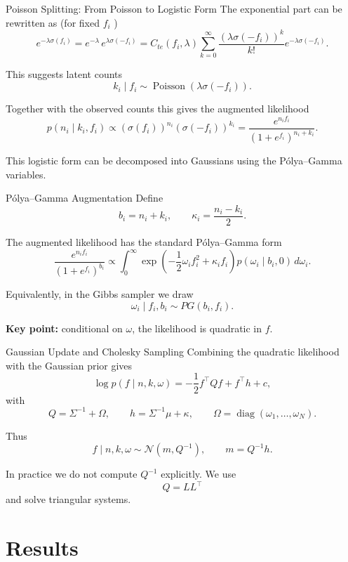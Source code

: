 \documentclass[11pt]{beamer}
\newcommand{\sigmoid}{\sigma}
\begin{document}
\begin{frame}{Poisson Splitting: From Poisson to Logistic Form}
The exponential part can be rewritten as (for fixed $f_i$ )
\[
e^{-\lambda\sigmoid(f_i)}
=
e^{-\lambda}\,e^{\lambda\sigmoid(-f_i)} = 
C_{te}(f_i,\lambda)\sum_{k=0}^\infty \frac{(\lambda\sigmoid(-f_i))^k}{k!} e^{-\lambda\sigma(-f_i)}.
\]

This suggests latent counts
\[
k_i\mid f_i \sim \operatorname{Poisson}(\lambda\sigmoid(-f_i)).
\]

Together with the observed counts this gives the augmented likelihood
\[
p(n_i\mid k_i, f_i)
\propto
\left(\sigmoid(f_i)\right)^{n_i}
\left(\sigmoid(-f_i)\right)^{k_i}
=
\frac{e^{n_i f_i}}{(1+e^{f_i})^{n_i+k_i}}.
\]

\medskip
This logistic form can be decomposed into Gaussians using the P\'olya--Gamma 
variables.
\end{frame}

\begin{frame}{P\'olya--Gamma Augmentation}
Define
\[
b_i=n_i+k_i,
\qquad
\kappa_i=\frac{n_i-k_i}{2}.
\]

The augmented likelihood has the standard P\'olya--Gamma form
\[
\frac{e^{n_i f_i}}{(1+e^{f_i})^{b_i}}
\propto
\int_0^\infty
\exp\left(
-\frac12\omega_i f_i^2 + \kappa_i f_i
\right)
p(\omega_i\mid b_i,0)\,d\omega_i.
\]

Equivalently, in the Gibbs sampler we draw
\[
\omega_i\mid f_i,b_i \sim PG(b_i,f_i).
\]

\medskip
\textbf{Key point:} conditional on $\omega$, the likelihood is quadratic in $f$.
\end{frame}

\begin{frame}{Gaussian Update and Cholesky Sampling}
Combining the quadratic likelihood with the Gaussian prior gives
\[
\log p(f\mid n,k,\omega)
=
-\frac12 f^\top Qf+f^\top h+c,
\]
with
\[
Q=\Sigma^{-1}+\Omega,
\qquad
h=\Sigma^{-1}\mu+\kappa,
\qquad
\Omega=\operatorname{diag}(\omega_1,\dots,\omega_N).
\]

Thus
\[
f\mid n,k,\omega \sim \mathcal N(m,Q^{-1}),
\qquad
m=Q^{-1}h.
\]

In practice we do not compute $Q^{-1}$ explicitly. We use
\[
Q=LL^\top
\]
and solve triangular systems.
\end{frame}

\section{Results}
\end{document}
